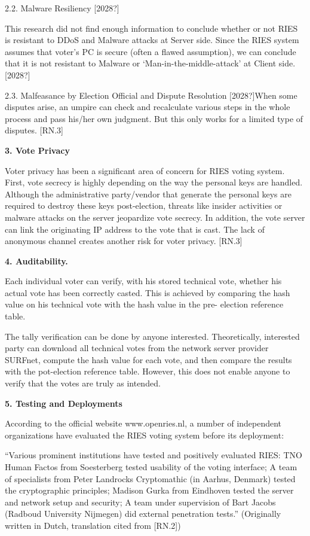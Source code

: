 2.2. Malware Resiliency [2028?]

This research did not find enough information to conclude whether or not RIES is resistant to DDoS and Malware attacks at Server side. Since the RIES system assumes that voter's PC is secure (often a flawed assumption), we can conclude that it is not resistant to Malware or `Man-in-the-middle-attack' at Client side. [2028?]

2.3. Malfeasance by Election Official and Dispute Resolution [2028?]When some disputes arise, an umpire can check and recalculate various steps in the whole process and pass his/her own judgment. But this only works for a limited type of disputes. [RN.3]

\textbf{3. Vote Privacy}

Voter privacy has been a significant area of concern for RIES voting system. First, vote secrecy is highly depending on the way the personal keys are handled. Although the administrative party/vendor that generate the personal keys are required to destroy these keys post-election, threats like insider activities or malware attacks on the server jeopardize vote secrecy. In addition, the vote server can link the originating IP address to the vote that is cast. The lack of anonymous channel creates another risk for voter privacy. [RN.3]

\textbf{4. Auditability.}

Each individual voter can verify, with his stored technical vote, whether his actual vote has been correctly casted. This is achieved by comparing the hash value on his technical vote with the hash value in the pre- election reference table.

The tally verification can be done by anyone interested. Theoretically, interested party can download all technical votes from the network server provider SURFnet, compute the hash value for each vote, and then compare the results with the pot-election reference table. However, this does not enable anyone to verify that the votes are truly as intended.

\textbf{5. Testing and Deployments}

According to the official website \textcolor[rgb]{0.078431375,0.3254902,0.6901961}{www.openries.nl, }a number of independent organizations have evaluated the RIES voting system before its deployment:

``Various prominent institutions have tested and positively evaluated RIES: TNO Human Factos from Soesterberg tested usability of the voting interface; A team of specialists from Peter Landrocks Cryptomathic (in Aarhus, Denmark) tested the cryptographic principles; Madison Gurka from Eindhoven tested the server and network setup and security; A team under supervision of Bart Jacobs (Radboud University Nijmegen) did external penetration tests.'' (Originally written in Dutch, translation cited from [RN.2])


